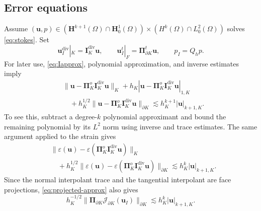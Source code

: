 \documentclass[review,hidelinks,onefignum,onetabnum]{siamart251216}
\begin{document}
\subsection{Error equations}
Assume $(\boldsymbol u,p)\in
(\boldsymbol H^{k+1}(\Omega)\cap\boldsymbol H_0^1(\Omega))\times
(H^k(\Omega)\cap L_0^2(\Omega))$ solves \eqref{eq:stokes}.
Set
\[
\boldsymbol u_I^{\operatorname{div}}|_K=\boldsymbol I_K^{\operatorname{div}}\boldsymbol u,
\qquad \boldsymbol u_I^t|_F=\boldsymbol\Pi_{\partial K}^t\boldsymbol u,
\qquad p_I=Q_hp.
\]
For later use, \eqref{eq:Iapprox}, polynomial approximation, and inverse
estimates imply
\begin{equation}\label{eq:projected-approx}
\begin{aligned}
&\|\boldsymbol u-\boldsymbol\Pi_K^o\boldsymbol I_K^{\operatorname{div}}\boldsymbol u\|_K
+h_K|\boldsymbol u-\boldsymbol\Pi_K^o\boldsymbol I_K^{\operatorname{div}}\boldsymbol u|_{1,K}\\
&\quad+h_K^{1/2}\|\boldsymbol u-\boldsymbol\Pi_K^o\boldsymbol I_K^{\operatorname{div}}\boldsymbol u\|_{\partial K}
\lesssim h_K^{k+1}|\boldsymbol u|_{k+1,K}.
\end{aligned}
\end{equation}
To see this, subtract a degree-$k$ polynomial approximant and bound the
remaining polynomial by its $L^2$ norm using inverse and trace estimates.
The same argument applied to the strain gives
\begin{equation}\label{eq:strain-approx}
\begin{aligned}
&\|\varepsilon(\boldsymbol u)-\varepsilon(\boldsymbol\Pi_K^o
\boldsymbol I_K^{\operatorname{div}}\boldsymbol u)\|_K\\
&\quad+h_K^{1/2}\|\varepsilon(\boldsymbol u)-\varepsilon(\boldsymbol\Pi_K^o
\boldsymbol I_K^{\operatorname{div}}\boldsymbol u)\|_{\partial K}
\lesssim h_K^k|\boldsymbol u|_{k+1,K}.
\end{aligned}
\end{equation}
Since the normal interpolant trace and the tangential interpolant are face
projections, \eqref{eq:projected-approx} also gives
\begin{equation}\label{eq:interpolant-jump}
h_K^{-1/2}\|\boldsymbol\Pi_{\partial K}\mathcal J_{\partial K}(\boldsymbol u_I)\|_{\partial K}
\lesssim h_K^k|\boldsymbol u|_{k+1,K}.
\end{equation}
\end{document}
